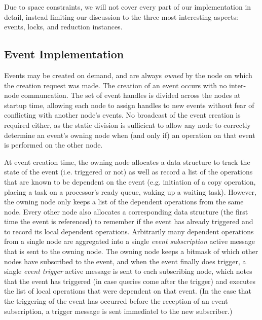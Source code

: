 Due to space constraints, we will not cover every part of our implementation in
detail, instead limiting our discussion to the three most interesting aspects:
events, locks, and reduction instances.

\subsection{Event Implementation}
\label{subsec:eventimpl}

Events may be created on demand, and are always {\em owned} by the node on which the
creation request was made.  The creation of an event occurs with no inter-node communcation.
The set of event
handles is divided across the nodes at startup time, allowing each node to assign handles
to new events without fear of conflicting with another node's events.  No broadcast of
the event creation is required either, as the static division is sufficient to allow any
node to correctly determine an event's owning node when (and only if) an operation on that
event is performed on the other node.

At event creation time, the owning node allocates a data structure to track the state of the event
(i.e. triggered or not) as well as record a list of the operations that are known to be dependent
on the event (e.g. initiation of a copy operation, placing a task on a processor's ready queue, waking
up a waiting task).  However, the owning node only keeps a list of the dependent operations from the same
node.  Every other node also allocates a corresponding data structure (the first time the event
is referenced) to remember if the event has already triggered and to record its local dependent operations.
Arbitrarily many dependent operations from a
single node are aggregated into a single {\em event subscription} active message that is sent to the
owning node.  The owning node keeps a bitmask of which other nodes have subscribed to the event, and when the
event finally does trigger, a single {\em event trigger} active message is sent to each subscribing node,
which notes that the event has triggered (in case queries come after the trigger) and executes the list
of local operations that were dependent on that event.  (In the case that the triggering of the event has
occurred before the reception of an event subscription, a trigger message is sent immediatel to the 
new subscriber.)

